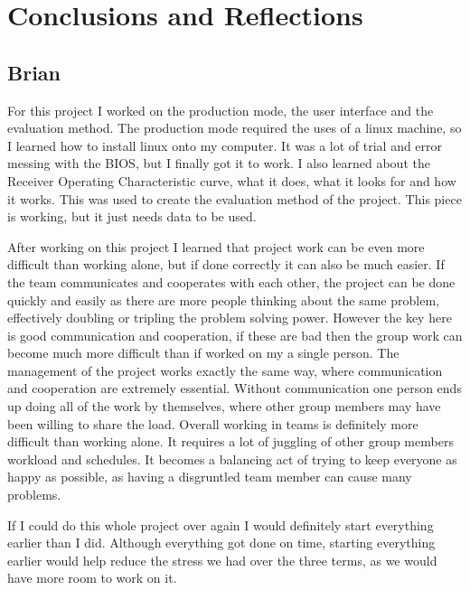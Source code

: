 \documentclass[onecolumn, draftclsnofoot,10pt, compsoc]{IEEEtran}
\begin{document}
	\section{Conclusions and Reflections}
	
	\subsection{Brian}
	For this project I worked on the production mode, the user interface and the evaluation method. The production mode required the uses of a linux machine, so I learned how to install linux onto my computer. It was a lot of trial and error messing with the BIOS, but I finally got it to work. I also learned about the Receiver Operating Characteristic curve, what it does, what it looks for and how it works. This was used to create the evaluation method of the project. This piece is working, but it just needs data to be used. 
	
	After working on this project I learned that project work can be even more difficult than working alone, but if done correctly it can also be much easier. If the team communicates and cooperates with each other, the project can be done quickly and easily as there are more people thinking about the same problem, effectively doubling or tripling the problem solving power. However the key here is good communication and cooperation, if these are bad then the group work can become much more difficult than if worked on my a single person. The management of the project works exactly the same way, where communication and cooperation are extremely essential. Without communication one person ends up doing all of the work by themselves, where other group members may have been willing to share the load. Overall working in teams is definitely more difficult than working alone. It requires a lot of juggling of other group members workload and schedules. It becomes a balancing act of trying to keep everyone as happy as possible, as having a disgruntled team member can cause many problems.
	
	If I could do this whole project over again I would definitely start everything earlier than I did. Although everything got done on time, starting everything earlier would help reduce the stress we had over the three terms, as we would have more room to work on it. 
	
\end{document}
